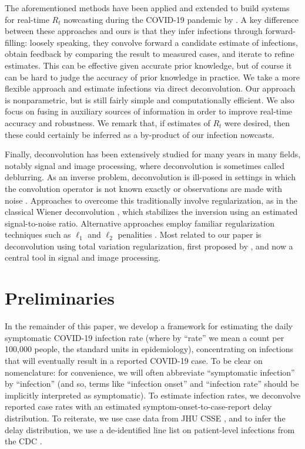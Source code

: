 \documentclass[sts]{imsart}
\theoremstyle{plain}
\theoremstyle{definition}
\theoremstyle{remark}
\begin{document}
The aforementioned methods have been applied and extended to build systems for
real-time $R_t$ nowcasting during the COVID-19 pandemic by \citet{Abbott:2020,
  rtlive, Chitwood:2021}. A key difference between these approaches and ours is 
that they infer infections through forward-filling: loosely speaking, they
convolve forward a candidate estimate of infections, obtain feedback by
comparing the result to measured cases, and iterate to refine estimates. This
can be effective given accurate prior knowledge, but of course it can be hard to
judge the accuracy of prior knowledge in practice. We take a more flexible
approach and estimate infections via direct deconvolution. Our approach is
nonparametric, but is still fairly simple and computationally efficient. We also
focus on fusing in auxiliary sources of information in order to improve
real-time accuracy and robustness. We remark that, if estimates of $R_t$ were
desired, then these could certainly be inferred as a by-product of our infection
nowcasts.

Finally, deconvolution has been extensively studied for many years in many
fields, notably signal and image processing, where deconvolution is sometimes
called deblurring. As an inverse problem, deconvolution is ill-posed in settings
in which the convolution operator is not known exactly or observations are made
with noise \citep{Oppenheim:2017}. Approaches to overcome this traditionally
involve regularization, as in the classical Wiener deconvolution
\citep{Wiener:1964}, which stabilizes the inversion using an estimated
signal-to-noise ratio. Alternative approaches employ familiar regularization
techniques such as $\ell_1$ and $\ell_2$ penalities \citep{Taylor:1979,
  Debeye:1990}. Most related to our paper is deconvolution using total variation 
regularization, first proposed by \citet{Rudin:1994}, and now a central tool in
signal and image processing.

\section{Preliminaries}
\label{sec:preliminaries}

In the remainder of this paper, we develop a framework for estimating the daily
symptomatic COVID-19 infection rate (where by ``rate'' we mean a count per
100,000 people, the standard units in epidemiology), concentrating on infections
that will eventually result in a reported COVID-19 case. To be clear on
nomenclature: for convenience, we will often abbreviate ``symptomatic
infection'' by ``infection'' (and so, terms like ``infection onset'' and
``infection rate'' should be implicitly interpreted as symptomatic). To
estimate infection rates, we deconvolve reported case rates with an estimated
symptom-onset-to-case-report delay distribution. To reiterate, we use case data
from JHU CSSE \citep{Dong:2020}, and to infer the delay distribution, we use a
de-identified line list on patient-level infections from the CDC
\citep{cdc_public}. 
\end{document}
